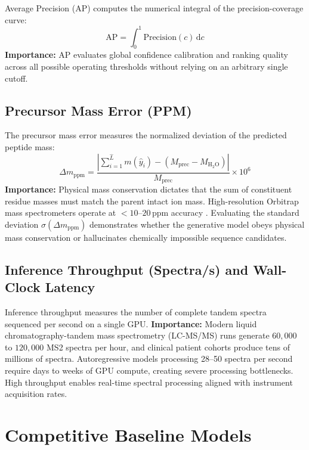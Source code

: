 Average Precision (AP) computes the numerical integral of the precision-coverage curve:
\begin{equation}
\text{AP} = \int_0^1 \text{Precision}(c) \, \mathrm{d}c
\label{eq:average_precision}
\end{equation}
\textbf{Importance:} AP evaluates global confidence calibration and ranking quality across all possible operating thresholds without relying on an arbitrary single cutoff.

\subsection{Precursor Mass Error (PPM)}

The precursor mass error measures the normalized deviation of the predicted peptide mass:
\begin{equation}
\Delta m_{\text{ppm}} = \frac{|\sum_{i=1}^{\hat{L}} m(\hat{y}_i) - (M_{\text{prec}} - M_{\text{H}_2\text{O}})|}{M_{\text{prec}}} \times 10^6
\label{eq:ppm_error}
\end{equation}
\textbf{Importance:} Physical mass conservation dictates that the sum of constituent residue masses must match the parent intact ion mass. High-resolution Orbitrap mass spectrometers operate at $< 10\text{--}20\,\text{ppm}$ accuracy \citep{Makarov2000, Zubarev2007}. Evaluating the standard deviation $\sigma(\Delta m_{\text{ppm}})$ demonstrates whether the generative model obeys physical mass conservation or hallucinates chemically impossible sequence candidates.

\subsection{Inference Throughput (Spectra/s) and Wall-Clock Latency}

Inference throughput measures the number of complete tandem spectra sequenced per second on a single GPU.
\textbf{Importance:} Modern liquid chromatography-tandem mass spectrometry (LC-MS/MS) runs generate $60,000$ to $120,000$ MS2 spectra per hour, and clinical patient cohorts produce tens of millions of spectra. Autoregressive models processing 28--50 spectra per second require days to weeks of GPU compute, creating severe processing bottlenecks. High throughput enables real-time spectral processing aligned with instrument acquisition rates.

\section{Competitive Baseline Models}

